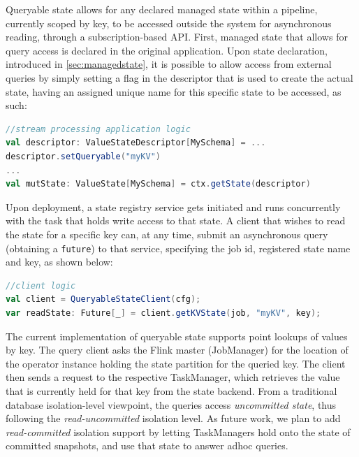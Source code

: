Queryable state allows for any declared managed state within a pipeline, currently scoped by key, to be accessed outside the system for asynchronous reading, through a subscription-based API. First, managed state that allows for query access is declared in the original application. Upon state declaration, introduced in \autoref{sec:managedstate}, it is possible to allow access from external queries by simply setting a flag in the descriptor that is used to create the actual state, having an assigned unique name for this specific state to be accessed, as such:

\begin{lstlisting}[language=scala]
//stream processing application logic
val descriptor: ValueStateDescriptor[MySchema] = ...
descriptor.setQueryable("myKV")
...
val mutState: ValueState[MySchema] = ctx.getState(descriptor)
\end{lstlisting}

\para{} Upon deployment, a state registry service gets initiated and runs concurrently with the task that holds write access to that state. A client that wishes to read the state for a specific key can, at any time, submit an asynchronous query (obtaining a \texttt{future}) to that service, specifying the job id, registered state name and key, as shown below:

\begin{lstlisting}[language=scala]
//client logic
val client = QueryableStateClient(cfg);
var readState: Future[_] = client.getKVState(job, "myKV", key);
\end{lstlisting}

The current implementation of queryable state supports point lookups of values by key. The query client asks the Flink master (JobManager) for the location of the operator instance holding the state partition for the queried key. The client then sends a request to the respective TaskManager, which retrieves the value that is currently held for that key from the state backend. From a traditional database isolation-level viewpoint, the queries access \emph{uncommitted state}, thus following the \emph{read-uncommitted} isolation level. As future work, we plan to add \emph{read-committed} isolation support by letting TaskManagers hold onto the state of committed snapshots, and use that state to answer  adhoc queries.


